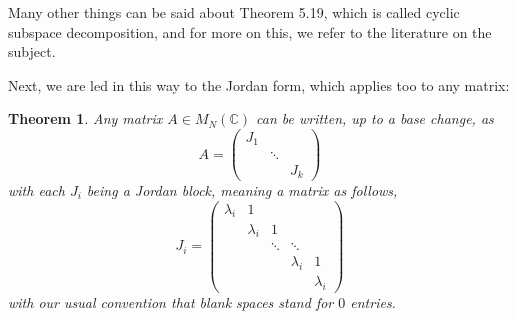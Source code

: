 \documentclass[12pt]{amsbook}
\newtheorem{theorem}{Theorem}[chapter]
\begin{document}
Many other things can be said about Theorem 5.19, which is called cyclic subspace decomposition, and for more on this, we refer to the literature on the subject.

\bigskip

Next, we are led in this way to the Jordan form, which applies too to any matrix:


\begin{theorem}
Any matrix $A\in M_N(\mathbb C)$ can be written, up to a base change, as
$$A=\begin{pmatrix}
J_1\\
&\ddots\\
&&J_k
\end{pmatrix}$$
with each $J_i$ being a Jordan block, meaning a matrix as follows,
$$J_i=\begin{pmatrix}
\lambda_i&1\\
&\lambda_i&1\\
&&\ddots&\ddots\\
&&&\lambda_i&1\\
&&&&\lambda_i
\end{pmatrix}$$
with our usual convention that blank spaces stand for $0$ entries.
\end{theorem}
\end{document}
